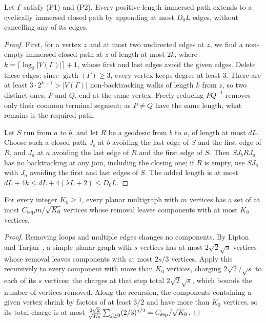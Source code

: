 \documentclass[11pt]{article}
\theoremstyle{definition}
\theoremstyle{plain}
\newcommand{\girth}{\operatorname{girth}}
\begin{document}
\begin{lemma}\label{lem:closure}
Let $\Gamma$ satisfy \textup{(P1)} and \textup{(P2)}. Every positive-length immersed path extends to a cyclically immersed closed path by appending at most $D_0L$ edges, without cancelling any of its edges.
\end{lemma}

\begin{proof}
First, for a vertex $z$ and at most two undirected edges at $z$, we find a non-empty immersed closed path at $z$ of length at most $2k$, where $k=\lceil\log_2|V(\Gamma)|\rceil+1$, whose first and last edges avoid the given edges. Delete these edges; since $\girth(\Gamma)\ge3$, every vertex keeps degree at least $3$. There are at least $3\cdot2^{k-1}>|V(\Gamma)|$ non-backtracking walks of length $k$ from $z$, so two distinct ones, $P$ and $Q$, end at the same vertex. Freely reducing $PQ^{-1}$ removes only their common terminal segment; as $P\neq Q$ have the same length, what remains is the required path.

Let $S$ run from $a$ to $b$, and let $R$ be a geodesic from $b$ to $a$, of length at most $dL$. Choose such a closed path $J_b$ at $b$ avoiding the last edge of $S$ and the first edge of $R$, and $J_a$ at $a$ avoiding the last edge of $R$ and the first edge of $S$. Then $SJ_bRJ_a$ has no backtracking at any join, including the closing one; if $R$ is empty, use $SJ_a$ with $J_a$ avoiding the first and last edges of $S$. The added length is at most $dL+4k\le dL+4(\lambda L+2)\le D_0L$.
\end{proof}

\begin{lemma}\label{lem:separator}
For every integer $K_0\ge1$, every planar multigraph with $m$ vertices has a set of at most $C_{\rm sep}m/\sqrt{K_0}$ vertices whose removal leaves components with at most $K_0$ vertices.
\end{lemma}

\begin{proof}
Removing loops and multiple edges changes no components. By Lipton and Tarjan~\cite[Cor.~2]{LiptonTarjan1979}, a simple planar graph with $s$ vertices has at most $2\sqrt2\sqrt s$ vertices whose removal leaves components with at most $2s/3$ vertices. Apply this recursively to every component with more than $K_0$ vertices, charging $2\sqrt2/\sqrt s$ to each of its $s$ vertices; the charges at that step total $2\sqrt2\sqrt s$, which bounds the number of vertices removed. Along the recursion, the components containing a given vertex shrink by factors of at least $3/2$ and have more than $K_0$ vertices, so its total charge is at most $\frac{2\sqrt2}{\sqrt{K_0}}\sum_{j\ge0}(2/3)^{j/2}=C_{\rm sep}/\sqrt{K_0}$.
\end{proof}
\end{document}
